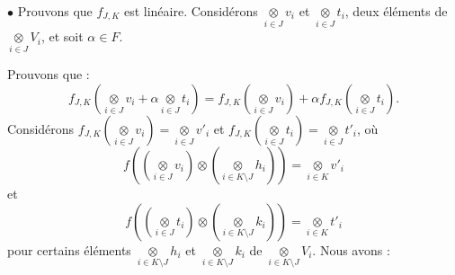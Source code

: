 \documentclass[a4paper, 14pt]{report}
\begin{document}
\begin{onehalfspace}
{\begin{enumerate}
		$\bullet$
		Prouvons que $f_{J,K}$ est linéaire. Considérons $\underset{i\in J}\otimes v_i$ et $\underset{i\in J}\otimes t_i$, deux éléments de $\underset{i\in J}\otimes V_i$, et soit $\alpha\in F$.
		
		Prouvons que :
		\[
		f_{J,K}(\underset{i\in J}\otimes v_i+ \alpha \underset{i\in J}\otimes t_i)= f_{J,K}(\underset{i\in J}\otimes v_i)+ \alpha f_{J,K}(\underset{i\in J}\otimes t_i).
		\]
		Considérons $f_{J,K}(\underset{i\in J}\otimes v_i)= \underset{i\in J}\otimes v'_i$ et $f_{J,K}(\underset{i\in J}\otimes t_i)= \underset{i\in J}\otimes t'_i$, où  
		\[
		f((\underset{i\in J}\otimes v_i)\otimes (\underset{i\in K\setminus J}\otimes h_i))= \underset{i\in K}\otimes v'_i
		\]
		et  
		\[
		f((\underset{i\in J}\otimes t_i)\otimes (\underset{i\in K\setminus J}\otimes k_i))= \underset{i\in K}\otimes t'_i
		\]
		pour certains éléments $\underset{i\in K\setminus J}\otimes h_i$ et $\underset{i\in K\setminus J}\otimes k_i$ de $\underset{i\in K\setminus J}\otimes V_i$. Nous avons :
		

\end{enumerate}}
\end{onehalfspace}
\end{document}
